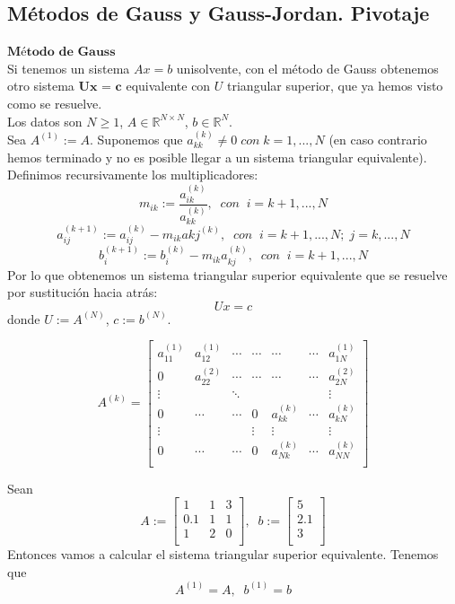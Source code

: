 \subsection{Métodos de Gauss y Gauss-Jordan. Pivotaje}
\begin{nlist}
\item $\textbf{Método de Gauss}$\\
Si tenemos un sistema $Ax = b$ unisolvente, con el método de Gauss obtenemos otro sistema $\textbf{Ux = c}$ equivalente con $U$ triangular superior, que ya hemos visto como se resuelve.\\
Los datos son $N \geq 1$, $A \in \mathbb{R}^{N \times N}$, $b \in \mathbb{R}^N$.\\
Sea $A^{(1)} := A$. Suponemos que $a_{kk}^{(k)} \neq 0 \; con \; k = 1,...,N$ (en caso contrario hemos terminado y no es posible llegar a un sistema triangular equivalente). Definimos recursivamente los multiplicadores:
\[ m_{ik} := \frac{a_{ik}^{(k)}}{a_{kk}^{(k)}}, \; \; con \; \; i = k+1,...,N \]
\[ a_{ij}^{(k+1)} := a_{ij}^{(k)} - m_{ik}a{kj}^{(k)}, \; \; con \; \; i = k+1,...,N; \; j = k,...,N \]
\[ b_i^{(k+1)} := b_i^{(k)} - m_{ik}a_{kj}^{(k)}, \; \; con \; \; i = k+1,...,N \]
Por lo que obtenemos un sistema triangular superior equivalente que se resuelve por sustitución hacia atrás:
\[ Ux = c \]
donde $U := A^{(N)}$, $c := b^{(N)}$.

\[ A^{(k)} = \begin{bmatrix}
a_{11}^{(1)} & a_{12}^{(1)} & \cdots & \cdots & \cdots & \cdots & a_{1N}^{(1)} \\
0 & a_{22}^{(2)} & \cdots & \cdots & \cdots & \cdots & a_{2N}^{(2)} \\
\vdots & & \ddots & & & & \vdots \\
0 & \cdots & \cdots & 0 & a_{kk}^{(k)} & \cdots & a_{kN}^{(k)} \\
\vdots & & & \vdots & \vdots & & \vdots \\
0 & \cdots & \cdots & 0 & a_{Nk}^{(k)} & \cdots & a_{NN}^{(k)}\\
\end{bmatrix}\]

	\begin{ejemplo}
	Sean
	\[ A := 
	\begin{bmatrix}
	1 & 1 & 3 \\
	0.1 & 1 & 1 \\
	1 & 2 & 0 \\
	\end{bmatrix}, \; \;
	b :=
	\begin{bmatrix}
	5 \\
	2.1 \\
	3 \\
	\end{bmatrix} \]
	Entonces vamos a calcular el sistema triangular superior equivalente.
	Tenemos que
	\[ A^{(1)} = A, \; \; b^{(1)} = b \]
			

\end{ejemplo}
\end{nlist}
